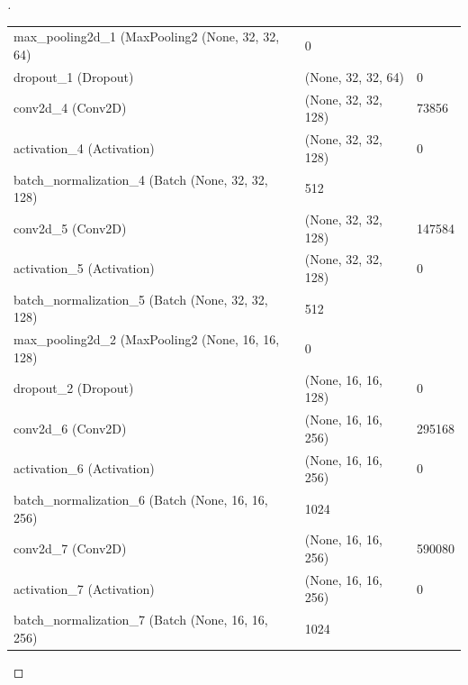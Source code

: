 \documentclass[12pt,oneside,geqno]{article}
\begin{document}
\begin{proof}[\color{red}{Solution}]
\begin{table}[]
\begin{tabular}{lll}
				max\_pooling2d\_1 (MaxPooling2 (None, 32, 32, 64)   & 0                                 &                               \\
				dropout\_1 (Dropout)                                & (None, 32, 32, 64)                & 0                             \\
				conv2d\_4 (Conv2D)                                  & (None, 32, 32, 128)               & 73856                         \\
				activation\_4 (Activation)                          & (None, 32, 32, 128)               & 0                             \\
				batch\_normalization\_4 (Batch (None, 32, 32, 128)  & 512                               &                               \\
				conv2d\_5 (Conv2D)                                  & (None, 32, 32, 128)               & 147584                        \\
				activation\_5 (Activation)                          & (None, 32, 32, 128)               & 0                             \\
				batch\_normalization\_5 (Batch (None, 32, 32, 128)  & 512                               &                               \\
				max\_pooling2d\_2 (MaxPooling2 (None, 16, 16, 128)  & 0                                 &                               \\
				dropout\_2 (Dropout)                                & (None, 16, 16, 128)               & 0                             \\
				conv2d\_6 (Conv2D)                                  & (None, 16, 16, 256)               & 295168                        \\
				activation\_6 (Activation)                          & (None, 16, 16, 256)               & 0                             \\
				batch\_normalization\_6 (Batch (None, 16, 16, 256)  & 1024                              &                               \\
				conv2d\_7 (Conv2D)                                  & (None, 16, 16, 256)               & 590080                        \\
				activation\_7 (Activation)                          & (None, 16, 16, 256)               & 0                             \\
				batch\_normalization\_7 (Batch (None, 16, 16, 256)  & 1024                              &                               \\

\end{tabular}
\end{table}
\end{proof}
\end{document}
